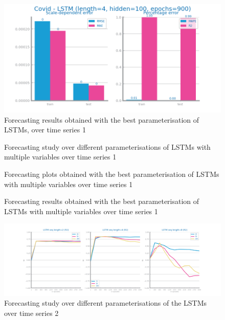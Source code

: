 \documentclass[10pt]{extarticle}
\begin{document}
\begin{figure}[H]
\centering\includegraphics[scale=0.5]{images/dataset1/time_series/Covid - LSTM (length=4, hidden=100, epochs=900)_forecasting_eval.png}
\caption{Forecasting results obtained with the best parameterisation of LSTMs, over time series 1}
\end{figure}

\begin{figure}[H]
\caption{Forecasting study over different parameterisations of LSTMs with multiple variables over time series 1}
\end{figure}

\begin{figure}[H]
\caption{Forecasting plots obtained with the best parameterisation of LSTMs with multiple variables over time series 1}
\end{figure}

\begin{figure}[H]
\caption{Forecasting results obtained with the best parameterisation of LSTMs with multiple variables over time series 1}
\end{figure}

\begin{figure}[H]
\centering\includegraphics[scale=0.4]{images/dataset2/time_series/fts_lstm_study_R2_8.png}
\caption{Forecasting study over different parameterisations of the LSTMs over time series 2}
\end{figure}
\end{document}
